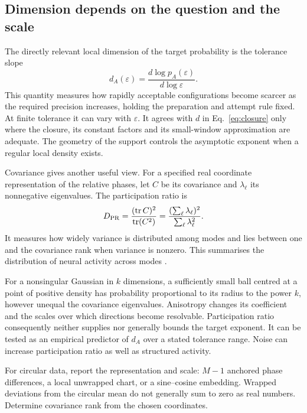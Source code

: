 \documentclass[11pt]{article}
\begin{document}
\subsection{Dimension depends on the question and the scale}

The directly relevant local dimension of the target probability is
the tolerance slope
\begin{equation}
 d_A(\varepsilon)=\frac{d\log p_A(\varepsilon)}
                       {d\log\varepsilon}.
 \label{eq:targetdim}
\end{equation}
This quantity measures how rapidly acceptable configurations become
scarcer as the required precision increases, holding the preparation
and attempt rule fixed. At finite tolerance it can vary with
$\varepsilon$. It agrees with $d$ in Eq.~\ref{eq:closure} only where
the closure, its constant factors and its small-window approximation
are adequate. The geometry of the support controls the asymptotic
exponent when a regular local density exists.

Covariance gives another useful view. For a specified real coordinate
representation of the relative phases, let $C$ be its covariance and
$\lambda_\ell$ its nonnegative eigenvalues. The participation ratio is
\begin{equation}
 D_{\rm PR}=\frac{(\operatorname{tr} C)^2}
                  {\operatorname{tr}(C^2)}
            =\frac{(\sum_\ell\lambda_\ell)^2}
                   {\sum_\ell\lambda_\ell^2}.
 \label{eq:pr}
\end{equation}
It measures how widely variance is distributed among modes and lies
between one and the covariance rank when variance is nonzero.
This summarises the distribution of neural activity across modes
\cite{cunningham2014,stringer2019}.

For a nonsingular Gaussian in $k$ dimensions, a sufficiently small ball
centred at a point of positive density has probability proportional to
its radius to the power $k$, however unequal the covariance
eigenvalues. Anisotropy changes its coefficient and the scales over
which directions become resolvable. Participation ratio consequently
neither supplies nor generally bounds the target exponent.
It can be tested as an empirical predictor of $d_A$ over a stated
tolerance range. Noise can increase participation ratio as well as
structured activity.

For circular data, report the representation and scale: $M-1$ anchored
phase differences, a local unwrapped chart, or a sine--cosine embedding. Wrapped deviations
from the circular mean do not generally sum to zero as real numbers.
Determine covariance rank from the chosen coordinates.
\end{document}

